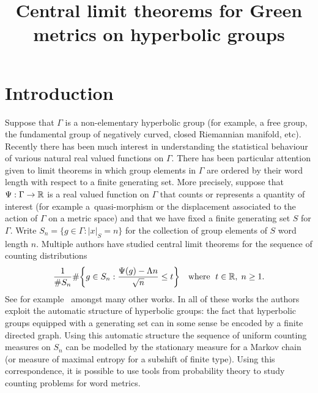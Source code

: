 \documentclass[AHL,Unicode,longabstracts,published]{cedram}
\title[Central limit theorems for Green metrics on hyperbolic groups]{Central limit theorems for Green metrics on hyperbolic groups}
\author[\initial{S.} \lastname{Cantrell}]{\firstname{Stephen} \lastname{Cantrell}}
\author[\initial{M.} \lastname{Pollicott}]{\firstname{Mark} \lastname{Pollicott}}
\newcommand{\G}{\Gamma}
\newcommand{\R}{\mathbb{R}}
\let\originalleft\left
\let\originalright\right
\renewcommand{\left}{\mathopen{}\mathclose\bgroup\originalleft}
\renewcommand{\right}{\aftergroup\egroup\originalright}
\renewcommand*{\to}{\mathchoice{\longrightarrow}{\rightarrow}{\rightarrow}{\rightarrow}}
\theoremstyle{plain}
\newcommand{\G}{\Gamma}
\begin{document}
\maketitle

\section*{Introduction}
Suppose that $\Gamma$ is a non-elementary hyperbolic group (for example, a free group, the fundamental group of negatively curved, closed Riemannian manifold, etc). Recently there has been much interest in understanding the statistical behaviour of various natural real valued functions on $\G$. There has been particular attention given to limit theorems in which group elements in $\G$ are ordered by their word length with respect to a finite generating set. More precisely, suppose that $\Psi: \G \to \R$ is a real valued function on $\G$ that counts or represents a quantity of interest (for example a~quasi-morphism or the displacement associated to the action of $\G$ on a metric space) and that we have fixed a finite generating set $S$ for $\Gamma$. Write $S_n = \{ g\in\Gamma: |x|_S = n \}$ for the collection of group elements of $S$ word length $n$. Multiple authors have studied central limit theorems for the sequence of counting distributions
\[
\frac{1}{\#S_n} \#\left\{ g \in S_n : \frac{\Psi(g)- \Lambda n}{\sqrt{n}} \le t \right\} \quad \text{where }\; t\in \R,\; n\ge 1.
\]
See for example~\cite{cantrell,CalegariFujiwara2010,chas.lalley,calegari.maher,cantrell.sert,calegari.walker,GTT2,GTT,horsham.sharp,rivin} amongst many other works. In all of these works the authors exploit the automatic structure of hyperbolic groups: the fact that hyperbolic groups equipped with a generating set can in some sense be encoded by a finite directed graph. Using this automatic structure the sequence of uniform counting measures on $S_n$ can be modelled by the stationary measure for a Markov chain (or measure of maximal entropy for a subshift of finite type). Using this correspondence, it is possible to use tools from probability theory to study counting problems for word metrics.
\end{document}

